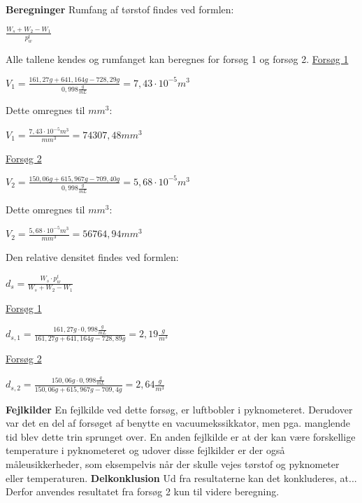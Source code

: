 \textbf{Beregninger}
\newline
Rumfang af tørstof findes ved formlen:
\begin{center}
	$\frac{W_s + W_2 - W_1}{p_{w}^t}$
\end{center}

Alle tallene kendes og rumfanget kan beregnes for forsøg 1 og forsøg 2.
\newline
\newline
\underline{Forsøg 1}
\begin{center}
	$V_1=\frac{161,27 g + 641,164 g - 728,29 g}{0,998 \frac{g}{mL}}=7,\!43\cdot 10^{-5} m^3$
\end{center}

Dette omregnes til $mm^3$:
\begin{center}
	$V_1=\frac{7,43\cdot 10^{-5} m^3}{mm^3}=74307,\!48 mm^3$
\end{center}

\underline{Forsøg 2}
\begin{center}
	$V_2=\frac{150,06 g + 615,967 g - 709,40 g}{0,998 \frac{g}{mL}}=5,\!68 \cdot 10^{-5} m^3$
\end{center}

Dette omregnes til $mm^3$:
\begin{center}
	$V_2=\frac{5,68 \cdot 10^{-5} m^3}{mm^3}=56764,\!94 mm^3$
\end{center}

Den relative densitet findes ved formlen:
\begin{center}
	$d_s=\frac{W_s\cdot p_w^t}{W_s + W_2 - W_1}$
\end{center}

\underline{Forsøg 1}
\begin{center}
	$d_{s,1}=\frac{161,27 g\cdot 0,998 \frac{g}{mL}}{161,27 g + 641,164 g - 728,89 g}=2,\!19 \frac{g}{m^3}$
\end{center}

\underline{Forsøg 2}
\begin{center}
	$d_{s,2}=\frac{150,06 g\cdot 0,998 \frac{g}{mL}}{150,06 g + 615,967 g - 709,4 g}=2,\!64 \frac{g}{m^3}$
\end{center}

\textbf{Fejlkilder}
\newline
En fejlkilde ved dette forsøg, er luftbobler i pyknometeret. Derudover var det en del af forsøget af benytte en vacuumekssikkator, men pga. manglende tid blev dette trin sprunget over. En anden fejlkilde er at der kan være forskellige temperature i pyknometeret og udover disse fejlkilder er der også måleusikkerheder, som eksempelvis når der skulle vejes tørstof og pyknometer eller temperaturen.
\newline
\newline
\textbf{Delkonklusion}
\newline
Ud fra resultaterne kan det konkluderes, at... Derfor anvendes resultatet fra forsøg 2 kun til videre beregning.